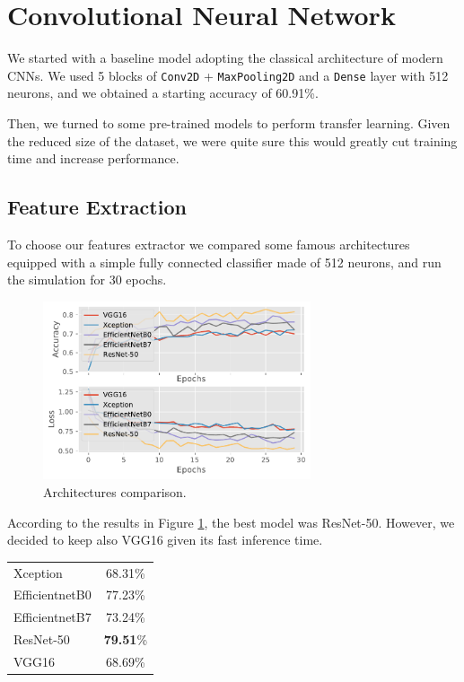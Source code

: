\documentclass[conference,compsoc,11pt]{IEEEtran}
\begin{document}
\section{Convolutional Neural Network}

We started with a baseline model adopting the classical architecture of modern CNNs. We used 5 blocks of \verb|Conv2D| + \verb|MaxPooling2D| and a \verb|Dense| layer with 512 neurons, and we obtained a starting accuracy of 60.91\%.

Then, we turned to some pre-trained models to perform transfer learning. Given the reduced size of the dataset, we were quite sure this would greatly cut training time and increase performance.

\subsection{Feature Extraction}\label{sec:features-extractor}

To choose our features extractor we compared some famous architectures equipped with a simple fully connected classifier made of 512 neurons, and run the simulation for 30 epochs.

\begin{figure}[h!]
\centering
\includegraphics[width=3.1in]{supernet}
\caption{Architectures comparison.}
\label{fig:supernet-comparison}
\end{figure}

According to the results in Figure \ref{fig:supernet-comparison}, the best model was ResNet-50. However, we decided to keep also VGG16 given its fast inference time.

\begin{center}
\begin{tabular}{ l c }
\hline\hline
Xception & 68.31\% \\
EfficientnetB0 & 77.23\% \\
EfficientnetB7 & 73.24\% \\
ResNet-50 & \textbf{79.51}\% \\
VGG16 & 68.69\% \\
\hline\hline
\end{tabular}
\end{center}
\end{document}

